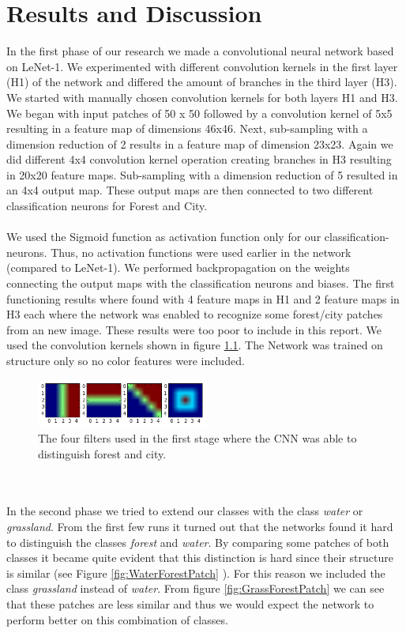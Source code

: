 \documentclass[a4paper,onecolumn]{report}
\begin{document}
\chapter{Results and Discussion}
\label{chap:resultsanddiscussion}
In the first phase of our research we made a convolutional neural network based on LeNet-1. We experimented with different convolution kernels in the first layer (H1) of the network and differed the amount of branches in the third layer (H3). We started with manually chosen convolution kernels for both layers H1 and H3. We began with input patches of 50 x 50 followed by a convolution kernel of 5x5 resulting in a feature map of dimensions 46x46. Next, sub-sampling with a dimension reduction of 2 results in a feature map of dimension 23x23. Again we did different 4x4 convolution kernel operation creating branches in H3 resulting in 20x20 feature maps. Sub-sampling with a dimension reduction of 5 resulted in an 4x4 output map. These output maps are then connected to two different classification neurons for Forest and City. \\\\
We used the Sigmoid function as activation function only for our classification-neurons. Thus, no activation functions were used earlier in the network (compared to LeNet-1). We performed backpropagation on the weights connecting the output maps with the classification neurons and biases. The first functioning results where found with 4 feature maps in H1 and 2 feature maps in H3 each where the network was enabled to recognize some forest/city patches from an new image. These results were too poor to include in this report. We used the convolution kernels shown in figure \ref{fig:firstFilters}. The Network was trained on structure only so no color features were included. 
\begin{figure}[bth!]
	\centering
	\includegraphics[width=0.5\textwidth]{./images/firstFilters.png}
	\caption{The four filters used in the first stage where the CNN was able to distinguish forest and city.}
	\label{fig:firstFilters}
\end{figure} 
\\\\
In the second phase we tried to extend our classes with the class \textit{water} or \textit{grassland}. From the first few runs it turned out that the networks found it hard to distinguish the classes \textit{forest} and \textit{water}. By comparing some patches of both classes it became quite evident that this distinction is hard since their structure is similar (see Figure \ref{fig:WaterForestPatch} ). For this reason we included the class \textit{grassland} instead of \textit{water}. From figure \ref{fig:GrassForestPatch} we can see that these patches are less similar and thus we would expect the network to perform better on this combination of classes.
\end{document}

